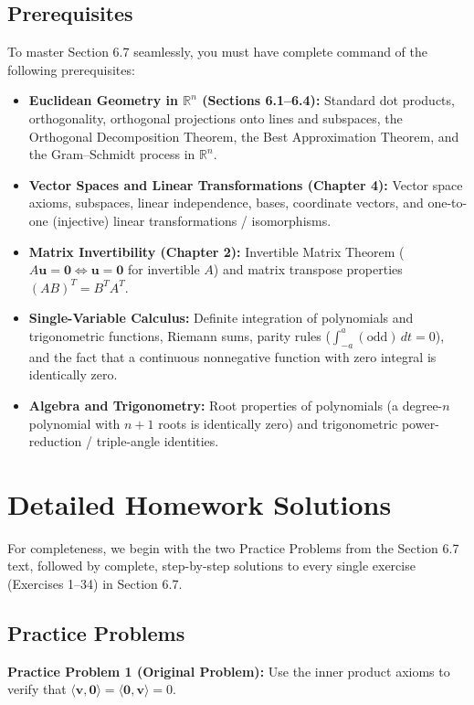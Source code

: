 \documentclass[11pt, letterpaper]{article}
\theoremstyle{definition}
\theoremstyle{remark}
\begin{document}
\subsection{Prerequisites}

To master Section 6.7 seamlessly, you must have complete command of the following prerequisites:
\begin{itemize}
    \item \textbf{Euclidean Geometry in $\mathbb{R}^n$ (Sections 6.1--6.4):} Standard dot products, orthogonality, orthogonal projections onto lines and subspaces, the Orthogonal Decomposition Theorem, the Best Approximation Theorem, and the Gram--Schmidt process in $\mathbb{R}^n$.
    \item \textbf{Vector Spaces and Linear Transformations (Chapter 4):} Vector space axioms, subspaces, linear independence, bases, coordinate vectors, and one-to-one (injective) linear transformations / isomorphisms.
    \item \textbf{Matrix Invertibility (Chapter 2):} Invertible Matrix Theorem ($A\mathbf{u} = \mathbf{0} \iff \mathbf{u} = \mathbf{0}$ for invertible $A$) and matrix transpose properties $(AB)^T = B^T A^T$.
    \item \textbf{Single-Variable Calculus:} Definite integration of polynomials and trigonometric functions, Riemann sums, parity rules ($\int_{-a}^a (\text{odd})\,dt = 0$), and the fact that a continuous nonnegative function with zero integral is identically zero.
    \item \textbf{Algebra and Trigonometry:} Root properties of polynomials (a degree-$n$ polynomial with $n+1$ roots is identically zero) and trigonometric power-reduction / triple-angle identities.
\end{itemize}

\newpage
\section{Detailed Homework Solutions}

For completeness, we begin with the two Practice Problems from the Section 6.7 text, followed by complete, step-by-step solutions to every single exercise (Exercises 1--34) in Section 6.7.

\subsection{Practice Problems}

\textbf{Practice Problem 1 (Original Problem):} Use the inner product axioms to verify that $\langle \mathbf{v}, \mathbf{0} \rangle = \langle \mathbf{0}, \mathbf{v} \rangle = 0$.
\end{document}
